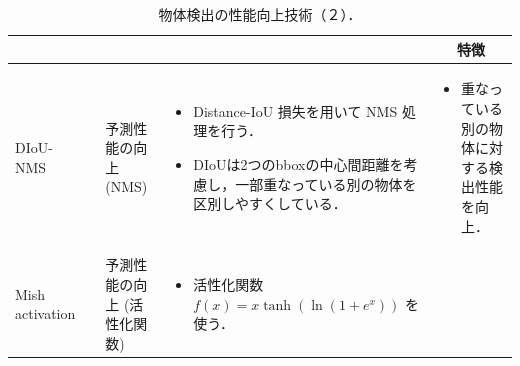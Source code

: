 \documentclass[twocolumn]{jsarticle} %
\begin{document}
\begin{table}
    \caption{物体検出の性能向上技術（２）．}
    \label{tbl-option2}
    \begin{center}
        \setlength{\tabcolsep}{3pt}
        \footnotesize
        \begin{tabularx}{\linewidth}{Xp{1.5cm}Xp{7cm}X} \toprule
            \centering{技術名称} & \centering{文献} & \centering{用途} & \centering{概要} & \multicolumn{1}{c}{特徴} \\ \midrule

            DIoU-NMS
            & \cite{ZWLLYR20} & 予測性能の向上 (NMS) & 
            \begin{itemize}
                \vspace{-0.7\baselineskip}
                \setlength{\leftskip}{-3mm}
                \item Distance-IoU 損失を用いて NMS 処理を行う．
                \item DIoUは2つのbboxの中心間距離を考慮し，一部重なっている別の物体を区別しやすくしている．
            \end{itemize}
            &
            \begin{itemize}
                \vspace{-0.7\baselineskip}
                \setlength{\leftskip}{-3mm}
                \item 重なっている別の物体に対する検出性能を向上．
            \end{itemize}
            \\

            Mish activation
            & \cite{Misra20} & 予測性能の向上 (活性化関数) 
            \vspace{0.7\baselineskip}
            & 
            \begin{itemize}
                \vspace{-0.7\baselineskip}
                \setlength{\leftskip}{-3mm}
                \item 活性化関数 $f(x) = x \tanh(\ln(1 + e^x))$ を使う．
            \end{itemize}
            &
            \\


\end{tabularx}
\end{center}
\end{table}
\end{document}
